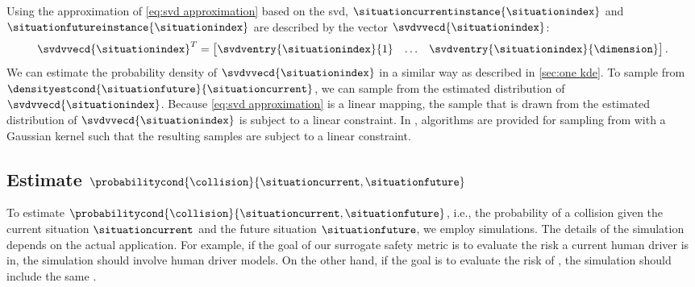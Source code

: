 Using the approximation of \cref{eq:svd approximation} based on the \ac{svd}, $\situationcurrentinstance{\situationindex}$ and $\situationfutureinstance{\situationindex}$ are described by the vector $\svdvvecd{\situationindex}$:
\begin{equation}
	\label{eq:reduced parameter vector}
	\svdvvecd{\situationindex}^T = \begin{bmatrix}
		\svdventry{\situationindex}{1} & \ldots & \svdventry{\situationindex}{\dimension}
	\end{bmatrix}.
\end{equation}
We can estimate the probability density of $\svdvvecd{\situationindex}$ in a similar way as described in \cref{sec:one kde}.
To sample from $\densityestcond{\situationfuture}{\situationcurrent}$, we can sample from the estimated distribution of $\svdvvecd{\situationindex}$.
Because \cref{eq:svd approximation} is a linear mapping, the sample that is drawn from the estimated distribution of $\svdvvecd{\situationindex}$ is subject to a linear constraint.
In \autocite{degelder2021conditional}, algorithms are provided for sampling from  with a Gaussian kernel such that the resulting samples are subject to a linear constraint.



\subsection{Estimate $\probabilitycond{\collision}{\situationcurrent, \situationfuture}$}
\label{sec:estimate collision}

To estimate $\probabilitycond{\collision}{\situationcurrent, \situationfuture}$, i.e., the probability of a collision given the current situation $\situationcurrent$ and the future situation $\situationfuture$, we employ simulations. 
The details of the simulation depends on the actual application. 
For example, if the goal of our surrogate safety metric is to evaluate the risk a current human driver is in, the simulation should involve human driver models. 
On the other hand, if the goal is to evaluate the risk of , the simulation should include the same .

